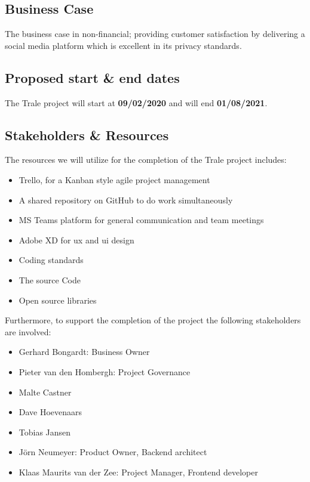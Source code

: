 \subsection{Business Case}\label{subsec:business-case}

The business case in non-financial;
providing customer satisfaction by delivering a social media platform which is excellent in its privacy standards.

\subsection{Proposed start \& end dates}\label{subsec:proposed-start-and-end-dates}

The Trale project will start at \textbf{09/02/2020} and will end \textbf{01/08/2021}.

\subsection{Stakeholders \& Resources}\label{subsec:stakeholders-and-resources}

The resources we will utilize for the completion of the Trale project includes:
\begin{itemize}
    \setlength\itemsep{-0.5em}
    \item Trello, for a Kanban style agile project management
    \item A shared repository on GitHub to do work simultaneously
    \item MS Teams platform for general communication and team meetings
    \item Adobe XD for \ac{ux} and \ac{ui} design
    \item Coding standards
    \item The source Code
    \item Open source libraries
\end{itemize}

Furthermore, to support the completion of the project the following stakeholders are involved:
\begin{itemize}
    \item Gerhard Bongardt: Business Owner
    \item Pieter van den Hombergh: Project Governance
    \item Malte Castner
    \item Dave Hoevenaars
    \item Tobias Jansen
    \item J\"orn Neumeyer: Product Owner, Backend architect
    \item Klaas Maurits van der Zee: Project Manager, Frontend developer
\end{itemize}

